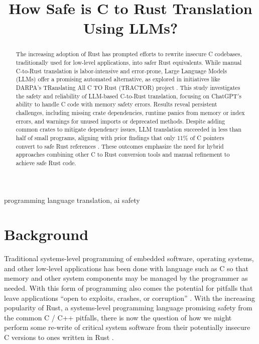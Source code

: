 \documentclass[conference]{IEEEtran}
\begin{document}
\title{How Safe is C to Rust Translation Using LLMs?}

\author{
\and
{}
}

\maketitle

\begin{abstract}
The increasing adoption of Rust has prompted efforts to rewrite insecure C codebases, traditionally used for low-level applications, into safer Rust equivalents. While manual C-to-Rust translation is labor-intensive and
error-prone, Large Language Models (LLMs) offer a promising automated alternative, as explored in
initiatives like DARPA’s TRanslating All C TO Rust (TRACTOR) project \cite{darpa_c_to_rust}. This study investigates
the safety and reliability of LLM-based C-to-Rust translation, focusing on ChatGPT’s ability to
handle C code with memory safety errors. Results reveal persistent challenges, including missing crate dependencies, runtime panics from memory or index errors, and warnings for unused imports or
deprecated methods. Despite adding common crates to mitigate dependency issues, LLM translation
succeeded in less than half of small programs, aligning with prior findings that only 11\% of C
pointers convert to safe Rust references \cite{emre2023aliasing}. These outcomes emphasize the need for hybrid approaches
combining other C to Rust conversion tools and manual refinement to achieve safe Rust code.
\end{abstract}

\begin{IEEEkeywords}
programming language translation, ai safety
\end{IEEEkeywords}

\section{Background}
Traditional systems-level programming of embedded software, operating systems,
and other low-level applications has been done with language such as C so that
memory and other system components may be managed by the programmer as needed.
With this form of programming also comes the potential for pitfalls that leave
applications ``open to exploits, crashes, or corruption'' 
\cite{klabnik2018rust_book}. With the increasing popularity of Rust, a
systems-level programming language promising safety from the common C / C++
pitfalls, there is now the question of how we might perform some re-write of
critical system software from their potentially insecure C versions to ones
written in Rust \cite{klabnik2018rust_book, emre2021translating}.
\end{document}
